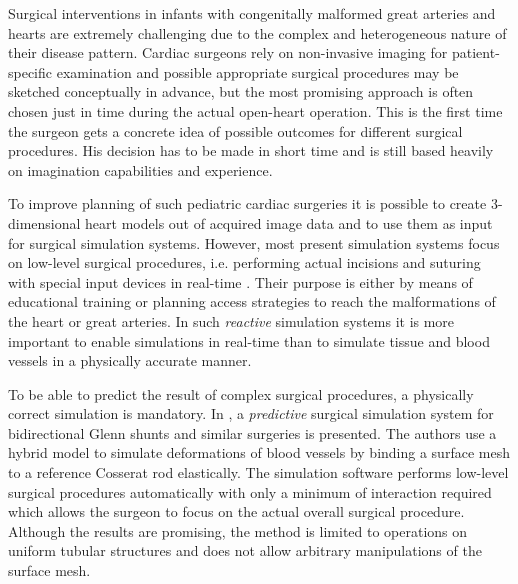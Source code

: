 Surgical interventions in infants with congenitally malformed great arteries and hearts are extremely challenging due to the complex and heterogeneous nature of their disease pattern. Cardiac surgeons rely on non-invasive imaging for patient-specific examination and possible appropriate surgical procedures may be sketched conceptually in advance, but the most promising approach is often chosen just in time during the actual open-heart operation. This is the first time the surgeon gets a concrete idea of possible outcomes for different surgical procedures. His decision has to be made in short time and is still based heavily on imagination capabilities and experience.

To improve planning of such pediatric cardiac surgeries it is possible to create 3-dimensional heart models out of acquired image data and to use them as input for surgical simulation systems. However, most present simulation systems focus on low-level surgical procedures, i.e. performing actual incisions and suturing with special input devices in real-time \cite{Sorensen2006,Mosegaard2004}. Their purpose is either by means of educational training or planning access strategies to reach the malformations of the heart or great arteries. In such {\itshape reactive} simulation systems it is more important to enable simulations in real-time than to simulate tissue and blood vessels in a physically accurate manner.

To be able to predict the result of complex surgical procedures, a physically correct simulation is mandatory. In \cite{Li2009}, a {\itshape predictive} surgical simulation system for bidirectional Glenn shunts and similar surgeries is presented. The authors use a hybrid model to simulate deformations of blood vessels by binding a surface mesh to a reference Cosserat rod elastically.
The simulation software performs low-level surgical procedures automatically with only a minimum of interaction required which allows the surgeon to focus on the actual overall surgical procedure.
Although the results are promising, the method is limited to operations on uniform tubular structures and does not allow arbitrary manipulations of the surface mesh.

